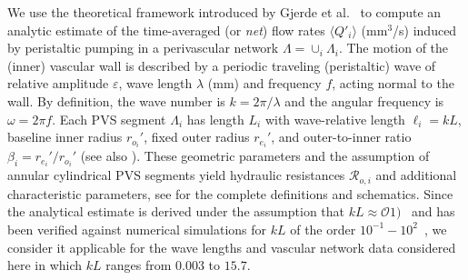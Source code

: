 \documentclass[fleqn,10pt]{wlscirep}
\begin{document}
We use the theoretical framework introduced by Gjerde et
al.~\cite{gjerde2023directional} to compute an analytic estimate of
the time-averaged (or \emph{net}) flow rates $\langle Q'_i \rangle$
(mm$^3$/s) induced by peristaltic pumping in a perivascular network
$\Lambda = \cup_i \Lambda_i$. The motion of the (inner) vascular wall
is described by a periodic traveling (peristaltic) wave of relative amplitude $\varepsilon$, wave length $\lambda$ (mm) and frequency $f$, acting normal to the wall. By definition, the wave number is $k = 2 \pi/\lambda$ and the angular frequency is $\omega = 2 \pi f$. Each PVS segment $\Lambda_i$ has length $L_i$ with wave-relative length $\ell_i = k L$, baseline inner radius $r_{o_i}'$, fixed outer radius $r_{e_i}'$, and outer-to-inner ratio $\beta_i = r_{e_i}'/r_{o_i}'$ (see also ). These geometric parameters and the assumption of annular cylindrical PVS segments yield hydraulic resistances $\mathcal{R}_{o, i}$ and additional characteristic parameters, see \cite{gjerde2023directional} for the complete definitions and schematics. Since the analytical estimate is derived
under the assumption that $k L \approx \mathcal{O} 1)$~\cite{gjerde2023directional} and has been verified against numerical simulations for $k L$ of the order $10^{-1}-10^2$~\cite[Table I]{gjerde2023directional}, we consider it
applicable for the wave lengths and vascular network data considered
here in which $k L$ ranges from $0.003$ to $15.7$.
% 
\end{document}

